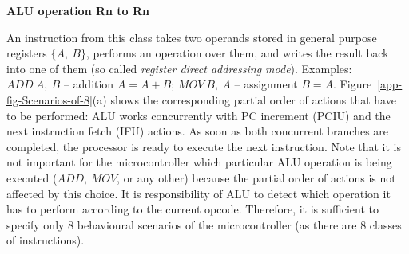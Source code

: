\textbf{ALU operation Rn to Rn}

An instruction from this class takes two operands stored in general
purpose registers $\{A,\ B\}$, performs an operation over them, and
writes the result back into one of them (so called \emph{register
direct addressing mode}). Examples: $\mathit{ADD\ A,\ B}$ -- addition
$A=A+B$; $\mathit{MOV\ B,\ A}$ -- assignment $B=A$. Figure~\ref{app-fig-Scenarios-of-8}(a)
shows the corresponding partial order of actions that have to be performed:
ALU works concurrently with PC increment (PCIU) and the next instruction
fetch (IFU) actions. As soon as both concurrent branches are completed,
the processor is ready to execute the next instruction. Note that
it is not important for the microcontroller which particular ALU operation
is being executed ($\mathit{ADD}$, $\mathit{MOV}$, or any other)
because the partial order of actions is not affected by this choice.
It is responsibility of ALU to detect which operation it has to perform
according to the current opcode. Therefore, it is sufficient to specify
only 8 behavioural scenarios of the microcontroller (as there are
8 classes of instructions).

